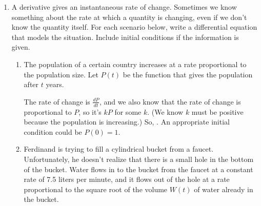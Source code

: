 \documentclass[main]{subfiles}
\begin{document}
\begin{enumerate}
    
\item A derivative gives an instantaneous rate of change. Sometimes we know something about the rate at which a quantity is changing, even if we don't know the quantity itself.
For each scenario below, write a differential equation that models the situation.  Include initial
conditions if the information is given.
\begin{enumerate}
\item  \label{diffeq-model-practice-1}
  \begin{problem}[\vfill]
    The population of a certain country increases at a rate proportional
    to the population size.  Let $P(t)$ be the function that gives the population after $t$ years.
  \end{problem}

  \begin{solution}
    The rate of change is $\frac{dP}{dt}$, and we also know that the rate
    of change is proportional to $P$, so it's $kP$ for some $k$.  (We know
    $k$ must be positive because the population is increasing.)  So,
    . An appropriate initial condition could be $\boxed{P(0)=1}$. 
  \end{solution}

\item  \label{diffeq-model-practice-3}
  
  
  \begin{problem}[\vfill]
    Ferdinand is trying to fill a cylindrical bucket from a faucet.  Unfortunately, he
    doesn't realize that there is a small hole in the bottom of the
    bucket.  Water flows in to the bucket from the faucet at a constant
    rate of 7.5 liters per minute, and it flows out of the hole at a rate
    proportional to the square root 
    of the volume $W(t)$ of water already in the bucket.
  \end{problem}


\end{enumerate}
\end{enumerate}
\end{document}
